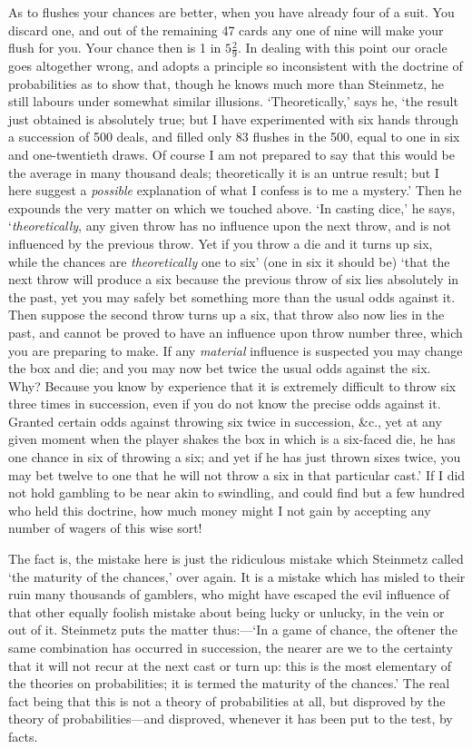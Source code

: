 \documentclass[letterpaper,12pt,oneside,openany]{memoir}
\begin{document}
As to flushes your chances are better, when you
have already four of a suit. You discard one, and out
of the remaining 47 cards any one of nine will make
your flush for you. Your chance then is 1 in $5\frac{2}{9}$. In
dealing with this point our oracle goes altogether wrong,
and adopts a principle so inconsistent with the doctrine
of probabilities as to show that, though he knows much
more than Steinmetz, he still labours under somewhat
similar illusions. `Theoretically,' says he, `the result
just obtained is absolutely true; but I have experimented
with six hands through a succession of 500
deals, and filled only 83 flushes in the 500, equal to one
in six and one-twentieth draws. Of course I am not
prepared to say that this would be the average in many
thousand deals; theoretically it is an untrue result; but
I here suggest a \emph{possible} explanation of what I confess
is to me a mystery.' Then he expounds the very matter
on which we touched above. `In casting dice,' he says,
`\textit{theoretically}, any given throw has no influence upon
the next throw, and is not influenced by the previous
throw. Yet if you throw a die and it turns up six,
while the chances are \textit{theoretically} one to six' (one in
six it should be) `that the next throw will produce a six
because the previous throw of six lies absolutely in the
past, yet you may safely bet something more than the
usual odds against it. Then suppose the second throw
turns up a six, that throw also now lies in the past, and
cannot be proved to have an influence upon throw
number three, which you are preparing to make. If
any \textit{material} influence is suspected you may change the
box and die; and you may now bet twice the usual
odds against the six. Why? Because you know by
experience that it is extremely difficult to throw six
three times in succession, even if you do not know the
precise odds against it. Granted certain odds against
throwing six twice in succession, \&c., yet at any
given moment when the player shakes the box in which
is a six-faced die, he has one chance in six of throwing
a six; and yet if he has just thrown sixes twice, you
may bet twelve to one that he will not throw a six in
that particular cast.' If I did not hold gambling to be
near akin to swindling, and could find but a few
hundred who held this doctrine, how much money
might I not gain by accepting any number of wagers
of this wise sort!

The fact is, the mistake here is just the ridiculous
mistake which Steinmetz called `the maturity of the
chances,' over again. It is a mistake which has misled
to their ruin many thousands of gamblers, who might
have escaped the evil influence of that other equally
foolish mistake about being lucky or unlucky, in the
vein or out of it. Steinmetz puts the matter thus:---`In
a game of chance, the oftener the same combination has
occurred in succession, the nearer are we to the certainty
that it will not recur at the next cast or turn up: this
is the most elementary of the theories on probabilities;
it is termed the maturity of the chances.' The real fact
being that this is not a theory of probabilities at all,
but disproved by the theory of probabilities---and disproved,
whenever it has been put to the test, by facts.
\end{document}
